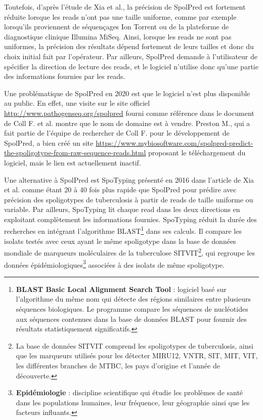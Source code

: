 \documentclass[twoside,a4paper,11pt,frenchb,openany]{report}
\begin{document}
Toutefois, d'après l'étude de Xia et al.\cite{xia}, la précision de SpolPred est fortement réduite lorsque les reads n'ont pas une taille uniforme, comme par exemple lorsqu'ils proviennent de séquençages Ion Torrent ou de la plateforme de diagnostique clinique Illumina MiSeq. Ainsi, lorsque les reads ne sont pas uniformes, la précision des résultats dépend fortement de leurs tailles et donc du choix initial fait par l'opérateur. Par ailleurs, SpolPred demande à l'utilisateur de spécifier la direction de lecture des reads, et le logiciel n'utilise donc qu'une partie des informations fournies par les reads.

Une problématique de SpolPred en 2020 est que le logiciel n'est plus disponible au public. En effet, une visite sur le site officiel \url{http://www.pathogenseq.org/spolpred} fourni comme référence dans le document \cite{coll} de Coll F. et al. montre que le nom de domaine est à vendre. Preston M., qui a fait partie de l'équipe de rechercher de Coll F. pour le développement de SpolPred, a bien créé un site \url{https://www.mybiosoftware.com/spolpred-predict-the-spoligotype-from-raw-sequence-reads.html} proposant le téléchargement du logiciel, mais le lien est actuellement inactif.

Une alternative à SpolPred est SpoTyping présenté en 2016 dans l'article \cite{xia} de Xia et al. comme étant 20 à 40 fois plus rapide que SpolPred pour prédire avec précision des spoligotypes de tuberculosis à partir de reads de taille uniforme ou variable. Par ailleurs, SpoTyping lit chaque read dans les deux directions en exploitant complètement les informations fournies. SpoTyping réduit la durée des recherches en intégrant l'algorithme BLAST\footnote{\textbf{BLAST Basic Local Alignment Search Tool} : logiciel basé sur l'algorithme du même nom qui détecte des régions similaires entre plusieurs séquences biologiques. Le programme compare les séquences de nucléotides aux séquences contenues dans la base de données BLAST pour fournir des résultats statistiquement significatifs.} dans ses calculs. Il compare les isolats testés avec ceux ayant le même spoligotype dans la base de données mondiale de marqueurs moléculaires de la tuberculose SITVIT\footnote{La base de données SITVIT comprend les spoligotypes de tuberculosis, ainsi que les marqueurs utilisés pour les détecter MIRU12, VNTR, SIT, MIT, VIT, les différentes branches de MTBC, les pays d'origine et l'année de découverte.}, qui regroupe les données épidémiologiques\footnote{\textbf{Epidémiologie} : discipline scientifique qui étudie les problèmes de santé dans les populations humaines, leur fréquence, leur géographie ainsi que les facteurs influants.} associées à des isolats de même spoligotype.
\end{document}
